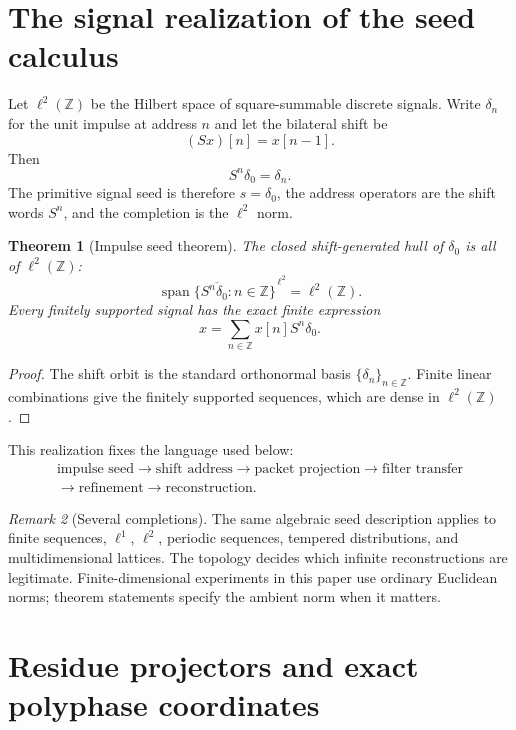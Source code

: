 \documentclass[11pt]{article}
\newtheorem{theorem}{Theorem}[section]
\theoremstyle{definition}
\theoremstyle{remark}
\newtheorem{remark}[theorem]{Remark}
\newcommand{\bbZ}{\mathbb Z}
\begin{document}
\tableofcontents
\listoffigures
\listoftables
\clearpage

\section{The signal realization of the seed calculus}

Let $\ell^2(\bbZ)$ be the Hilbert space of square-summable discrete signals. Write $\delta_n$ for the unit impulse at address $n$ and let the bilateral shift be
\[
(Sx)[n]=x[n-1].
\]
Then
\[
S^n\delta_0=\delta_n.
\]
The primitive signal seed is therefore $s=\delta_0$, the address operators are the shift words $S^n$, and the completion is the $\ell^2$ norm.

\begin{theorem}[Impulse seed theorem]
The closed shift-generated hull of $\delta_0$ is all of $\ell^2(\bbZ)$:
\[
\boxed{
\overline{\operatorname{span}\{S^n\delta_0:n\in\bbZ\}}^{\,\ell^2}
=\ell^2(\bbZ).
}
\]
Every finitely supported signal has the exact finite expression
\[
x=\sum_{n\in\bbZ}x[n]S^n\delta_0.
\]
\end{theorem}

\begin{proof}
The shift orbit is the standard orthonormal basis $\{\delta_n\}_{n\in\bbZ}$. Finite linear combinations give the finitely supported sequences, which are dense in $\ell^2(\bbZ)$.
\end{proof}

This realization fixes the language used below:
\[
\begin{gathered}
\text{impulse seed}\longrightarrow\text{shift address}\longrightarrow\text{packet projection}\longrightarrow\text{filter transfer}\\
\longrightarrow\text{refinement}\longrightarrow\text{reconstruction}.
\end{gathered}
\]

\begin{remark}[Several completions]
The same algebraic seed description applies to finite sequences, $\ell^1$, $\ell^2$, periodic sequences, tempered distributions, and multidimensional lattices. The topology decides which infinite reconstructions are legitimate. Finite-dimensional experiments in this paper use ordinary Euclidean norms; theorem statements specify the ambient norm when it matters.
\end{remark}

\section{Residue projectors and exact polyphase coordinates}
\end{document}
